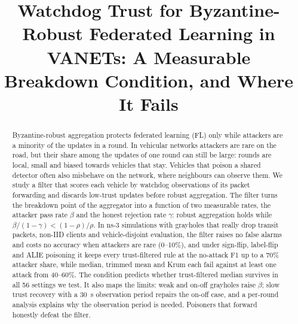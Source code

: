 \documentclass[conference]{IEEEtran}
\newcommand{\todo}[1]{\textcolor{red}{[TODO: #1]}}
\begin{document}
\title{Watchdog Trust for Byzantine-Robust Federated Learning in VANETs: A Measurable Breakdown Condition, and Where It Fails}

\author{%
}

\maketitle

\begin{abstract}
Byzantine-robust aggregation protects federated learning (FL) only while attackers are a minority of the updates
in a round. In vehicular networks attackers are rare on the road, but their share among the updates of one round
can still be large: rounds are local, small and biased towards vehicles that stay. Vehicles that poison a shared
detector often also misbehave on the network, where neighbours can observe them. We study a filter that scores
each vehicle by watchdog observations of its packet forwarding and discards low-trust updates before robust
aggregation. The filter turns the breakdown point of the aggregator into a function of two measurable rates, the
attacker pass rate $\beta$ and the honest rejection rate $\gamma$: robust aggregation holds while
$\beta/(1-\gamma) < (1-\rho)/\rho$. In ns-3 simulations with grayholes that really drop transit packets, non-IID
clients and vehicle-disjoint evaluation, the filter raises no false alarms and costs no accuracy when attackers
are rare (0--10\%), and under sign-flip, label-flip and ALIE poisoning it keeps every trust-filtered rule at the no-attack F1 up to a 70\%
attacker share, while median, trimmed mean and Krum each fail against at least one attack from 40--60\%. The
condition predicts whether trust-filtered median survives in all 56 settings we test. It also maps the limits: weak and on-off grayholes
raise $\beta$; slow trust recovery with a 30~s observation period repairs the on-off case, and a per-round analysis
explains why the observation period is needed. Poisoners that forward honestly defeat the filter.
\end{abstract}
\end{document}
